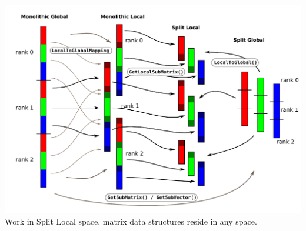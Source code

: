 \begin{frame}
  \includegraphics[width=\textwidth]{figures/PETSc/LocalSpaces} \\[-.5em]
  Work in Split Local space, matrix data structures reside in any space.
\end{frame}
